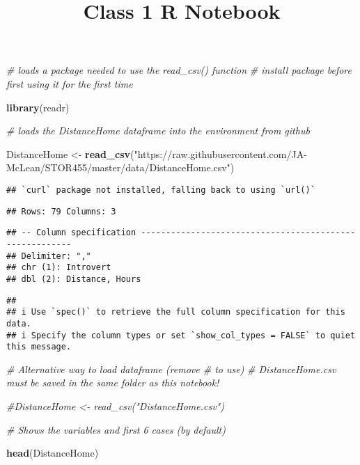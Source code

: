 \documentclass[
]{article}
\title{Class 1 R Notebook}
\author{}
\date{\vspace{-2.5em}}
\newenvironment{Shaded}{\begin{snugshade}}{\end{snugshade}}
\newcommand{\CommentTok}[1]{\textcolor[rgb]{0.56,0.35,0.01}{\textit{#1}}}
\newcommand{\KeywordTok}[1]{\textcolor[rgb]{0.13,0.29,0.53}{\textbf{#1}}}
\newcommand{\NormalTok}[1]{#1}
\newcommand{\StringTok}[1]{\textcolor[rgb]{0.31,0.60,0.02}{#1}}
\begin{document}
\maketitle

\begin{Shaded}
\begin{Highlighting}[]
\CommentTok{# loads a package needed to use the read_csv() function}
\CommentTok{# install package before first using it for the first time}

\KeywordTok{library}\NormalTok{(readr)}

\CommentTok{# loads the DistanceHome dataframe into the environment from github}

\NormalTok{DistanceHome <-}\StringTok{ }\KeywordTok{read_csv}\NormalTok{(}\StringTok{"https://raw.githubusercontent.com/JA-McLean/STOR455/master/data/DistanceHome.csv"}\NormalTok{)}
\end{Highlighting}
\end{Shaded}

\begin{verbatim}
## `curl` package not installed, falling back to using `url()`
\end{verbatim}

\begin{verbatim}
## Rows: 79 Columns: 3
\end{verbatim}

\begin{verbatim}
## -- Column specification --------------------------------------------------------
## Delimiter: ","
## chr (1): Introvert
## dbl (2): Distance, Hours
\end{verbatim}

\begin{verbatim}
## 
## i Use `spec()` to retrieve the full column specification for this data.
## i Specify the column types or set `show_col_types = FALSE` to quiet this message.
\end{verbatim}

\begin{Shaded}
\begin{Highlighting}[]
\CommentTok{# Alternative way to load dataframe (remove # to use)}
\CommentTok{# DistanceHome.csv must be saved in the same folder as this notebook!}

\CommentTok{#DistanceHome <- read_csv("DistanceHome.csv")}


\CommentTok{# Shows the variables and first 6 cases (by default)}

\KeywordTok{head}\NormalTok{(DistanceHome) }
\end{Highlighting}
\end{Shaded}
\end{document}
